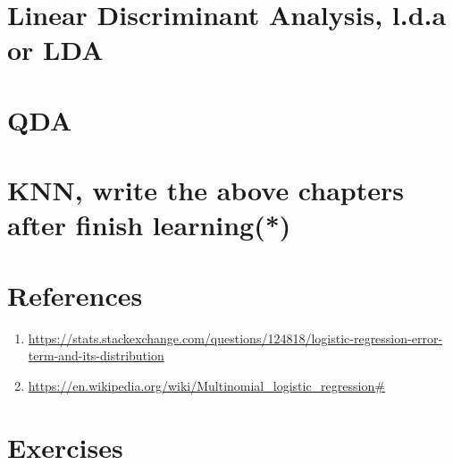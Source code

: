 \section{Linear  Discriminant Analysis, l.d.a or LDA}
\section{QDA}
\section{KNN, write the above chapters after finish learning(*)}
\section{References}
\begin{enumerate}
    \item \url{https://stats.stackexchange.com/questions/124818/logistic-regression-error-term-and-its-distribution}
    \item \url{https://en.wikipedia.org/wiki/Multinomial_logistic_regression#}
\end{enumerate}
\section{Exercises}


